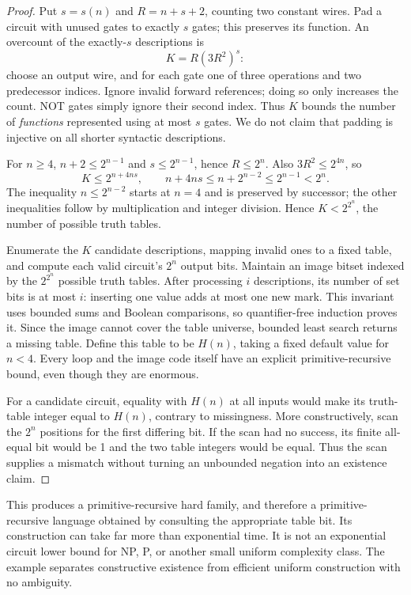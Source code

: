 \begin{proof}
Put \(s=s(n)\) and \(R=n+s+2\), counting two constant wires. Pad a circuit
with unused gates to exactly \(s\) gates; this preserves its function.
An overcount of the exactly-\(s\) descriptions is
\[
 K=R(3R^2)^s:
\]
choose an output wire, and for each gate one of three operations and two
predecessor indices. Ignore invalid forward references; doing so only
increases the count. NOT gates simply ignore their second index. Thus
\(K\) bounds the number of \emph{functions} represented using at most
\(s\) gates. We do not claim that padding is injective on all shorter
syntactic descriptions.

For \(n\ge4\), \(n+2\le2^{n-1}\) and \(s\le2^{n-1}\), hence
\(R\le2^n\). Also \(3R^2\le2^{4n}\), so
\[
 K\le2^{n+4ns},\qquad
 n+4ns\le n+2^{n-2}\le2^{n-1}<2^n.
\]
The inequality \(n\le2^{n-2}\) starts at \(n=4\) and is preserved by
successor; the other inequalities follow by multiplication and integer
division. Hence \(K<2^{2^n}\), the number of possible truth tables.

Enumerate the \(K\) candidate descriptions, mapping invalid ones to a
fixed table, and compute each valid circuit's \(2^n\) output bits. Maintain
an image bitset indexed by the \(2^{2^n}\) possible truth tables. After
processing \(i\) descriptions, its number of set bits is at most \(i\):
inserting one value adds at most one new mark. This invariant uses bounded
sums and Boolean comparisons, so quantifier-free induction proves it.
Since the image cannot cover the table universe, bounded least search
returns a missing table. Define this table to be \(H(n)\), taking a fixed
default value for \(n<4\). Every loop and the image code itself have an
explicit primitive-recursive bound, even though they are enormous.

For a candidate circuit, equality with \(H(n)\) at all inputs would make
its truth-table integer equal to \(H(n)\), contrary to missingness.
More constructively, scan the \(2^n\) positions for the first differing
bit. If the scan had no success, its finite all-equal bit would be 1 and
the two table integers would be equal. Thus the scan supplies a mismatch
without turning an unbounded negation into an existence claim.
\end{proof}

This produces a primitive-recursive hard family, and therefore a
primitive-recursive language obtained by consulting the appropriate table
bit. Its construction can take far more than exponential time. It is not
an exponential circuit lower bound for NP, P, or another small uniform
complexity class. The example separates constructive existence from
efficient uniform construction with no ambiguity.


